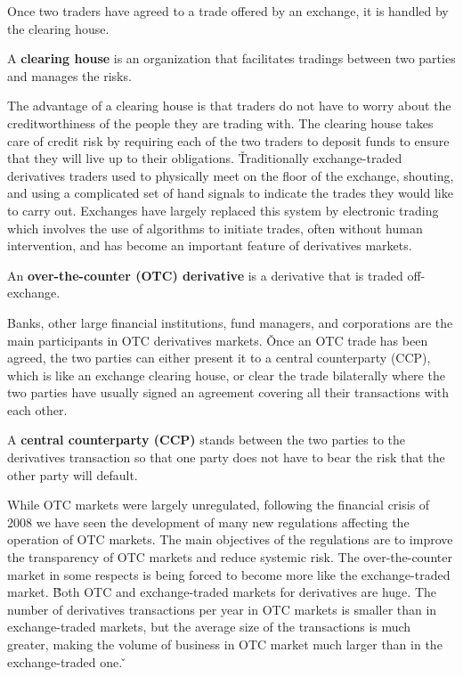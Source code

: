 Once two traders have agreed to a trade offered by an exchange, it is handled by the clearing house.

A \textbf{clearing house} is an organization that facilitates tradings between two parties and manages the risks.
\ed

The advantage of a clearing house is that traders do not have to worry about the creditworthiness of the people they
are trading with. The clearing house takes care of credit risk by requiring each of the two traders to deposit funds
to ensure that they will live up to their obligations. \v

Traditionally exchange-traded derivatives traders used to physically meet on the floor of the exchange, shouting, and
using a complicated set of hand signals to indicate the trades they would like to carry out. Exchanges have largely
replaced this system by electronic trading which involves the use of algorithms to initiate trades, often without human
intervention, and has become an important feature of derivatives markets.

An \textbf{over-the-counter (OTC) derivative} is a derivative that is traded off-exchange.
\ed

Banks, other large financial institutions, fund managers, and corporations are the main participants in OTC derivatives
markets. \v

Once an OTC trade has been agreed, the two parties can either present it to a central counterparty (CCP), which is like
an exchange clearing house, or clear the trade bilaterally where the two parties have usually signed an agreement
covering all their transactions with each other.

A \textbf{central counterparty (CCP)} stands between the two parties to the derivatives transaction so that one party
does not have to bear the risk that the other party will default.
\ed

While OTC markets were largely unregulated, following the financial crisis of 2008 we have seen the development of
many new regulations affecting the operation of OTC markets. The main objectives of the regulations are to improve
the transparency of OTC markets and reduce systemic risk. The over-the-counter market in some respects is being forced
to become more like the exchange-traded market. \v

Both OTC and exchange-traded markets for derivatives are huge. The number of derivatives transactions per year in OTC
markets is smaller than in exchange-traded markets, but the average size of the transactions is much greater, making the
volume of business in OTC market much larger than in the exchange-traded one. \v


